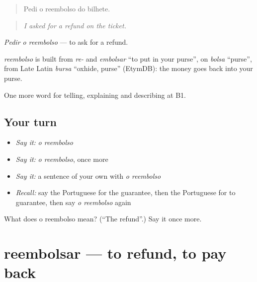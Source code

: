 \begin{quote}
Pedi o reembolso do bilhete.
\end{quote}

\begin{quote}
\emph{I asked for a refund on the ticket.}
\end{quote}

\emph{Pedir o reembolso} — to ask for a refund.

\begin{cousinweb}
\emph{reembolso} is built from \emph{re-} and \emph{embolsar} \textquotedblleft{}to put in your purse\textquotedblright{}, on \emph{bolsa} \textquotedblleft{}purse\textquotedblright{}, from Late Latin \emph{bursa} \textquotedblleft{}oxhide, purse\textquotedblright{} (EtymDB): the money goes back into your purse.
\end{cousinweb}

\begin{grammarlens}[title={What you've built}]
One more word for telling, explaining and describing at B1.
\end{grammarlens}

\subsection*{Your turn}
\begin{itemize}
\raggedright
  \item \emph{Say it:} \emph{o reembolso}
  \item \emph{Say it:} \emph{o reembolso}, once more
  \item \emph{Say it:} a sentence of your own with \emph{o reembolso}
  \item \emph{Recall:} say the Portuguese for the guarantee, then the Portuguese for to guarantee, then say \emph{o reembolso} again
\end{itemize}

\begin{tcolorbox}[breakable,colback=teal!4,colframe=teal!35!black,title={Before you move on}]
What does o reembolso mean? (\textquotedblleft{}The refund\textquotedblright{}.) Say it once more.
\end{tcolorbox}
\section[reembolsar]{reembolsar — to refund, to pay back}

\label{lesson:PT-C394-reembolsar}




